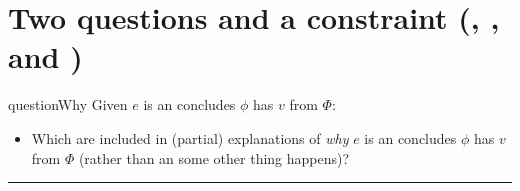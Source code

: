 \documentclass[10pt]{article}
\newcommand\lLine{{\color{lightgray} \noindent\rule{\textwidth}{0.4pt}}}
\begin{document}
\begin{comment}
  The constraint on reasoning that is stated with these abstraction is intended to be theory-neutral level.
\end{comment}


\begin{comment}
  If you like, think of this as a relation of support.
  However, \fofr{1} are understood descriptively, i.e.\ there's no normative constraints on \fofr{1} here.
  If you'd like additional motivation for this sort of thing, consider propositional justification.
\end{comment}

\section{Two questions and a constraint \hfill (\qWhy{}, \qHow{}, and \issueInclusion{})}
\label{sec:target}

\vfill

\begin{comment}
  With from and \fofr{1} in hand, two questions.
\end{comment}

\begin{note}
  \begin{question}{questionWhy}{\qWhy{}}
    Given \(e\) is an  \vAgent{} concludes \prop{} \(\phi\) has \val{} \(v\) from \pool{} \(\Phi\):
    \begin{itemize}
    \item
      Which  are included in (partial) explanations of \emph{why} \(e\) is an  \vAgent{} concludes \prop{} \(\phi\) has \val{} \(v\) from \pool{} \(\Phi\) (rather than an  some other thing happens)?
    \end{itemize}
    \vspace{-1\baselineskip}
  \end{question}
\end{note}


\lLine
\end{document}
